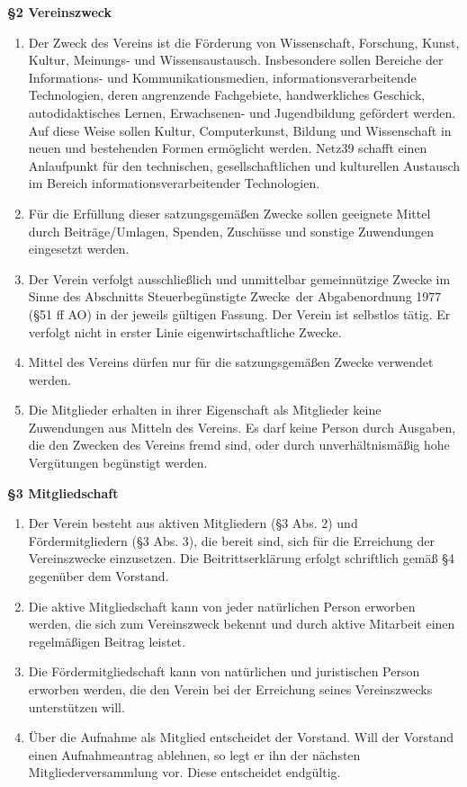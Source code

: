\documentclass[a4paper,
               12pt,
               titlepage,
               parskip=half]{scrartcl}
\begin{document}
\textbf{§2 Vereinszweck}
{\small 
\begin{enumerate}
	\item Der Zweck des Vereins ist die Förderung von Wissenschaft, Forschung, Kunst, Kultur, Meinungs- und Wissensaustausch. Insbesondere sollen Bereiche der Informations- und Kommunikationsmedien, informationsverarbeitende Technologien, deren angrenzende Fachgebiete, handwerkliches Geschick, autodidaktisches Lernen, Erwachsenen- und Jugendbildung gefördert werden. Auf diese Weise sollen Kultur, Computerkunst, Bildung und Wissenschaft in neuen und bestehenden Formen ermöglicht werden. Netz39 schafft einen Anlaufpunkt für den technischen, gesellschaftlichen und kulturellen Austausch im Bereich informationsverarbeitender Technologien.
	\item Für die Erfüllung dieser satzungsgemäßen Zwecke sollen geeignete Mittel durch Beiträge/Umlagen, Spenden, Zuschüsse und sonstige Zuwendungen eingesetzt werden.
	\item Der Verein verfolgt ausschließlich und unmittelbar gemeinnützige Zwecke im Sinne des Abschnitts \glqq Steuerbegünstigte Zwecke\grqq\ der Abgabenordnung 1977 (§51 ff AO) in der jeweils gültigen Fassung. Der Verein ist selbstlos tätig. Er verfolgt nicht in erster Linie eigenwirtschaftliche Zwecke.
	\item Mittel des Vereins dürfen nur für die satzungsgemäßen Zwecke verwendet werden.
	\item Die Mitglieder erhalten in ihrer Eigenschaft als Mitglieder keine Zuwendungen aus Mitteln des Vereins. Es darf keine Person durch Ausgaben, die den Zwecken des Vereins fremd sind, oder durch unverhältnismäßig hohe Vergütungen begünstigt werden.
\end{enumerate}
}

\newpage

\textbf{§3 Mitgliedschaft}
{\small
\begin{enumerate}
	\item Der Verein besteht aus aktiven Mitgliedern (§3 Abs. 2) und Fördermitgliedern (§3 Abs. 3), die bereit sind, sich für die Erreichung der Vereinszwecke einzusetzen. Die Beitrittserklärung erfolgt schriftlich gemäß §4 gegenüber dem Vorstand.
	\item Die aktive Mitgliedschaft kann von jeder natürlichen Person erworben werden, die sich zum Vereinszweck bekennt und durch aktive Mitarbeit einen regelmäßigen Beitrag leistet.
	\item Die Fördermitgliedschaft kann von natürlichen und juristischen Person erworben werden, die den Verein bei der Erreichung seines Vereinszwecks unterstützen will.
	\item Über die Aufnahme als Mitglied entscheidet der Vorstand. Will der Vorstand einen Aufnahmeantrag ablehnen, so legt er ihn der nächsten Mitgliederversammlung vor. Diese entscheidet endgültig.
\end{enumerate}
}
\end{document}
